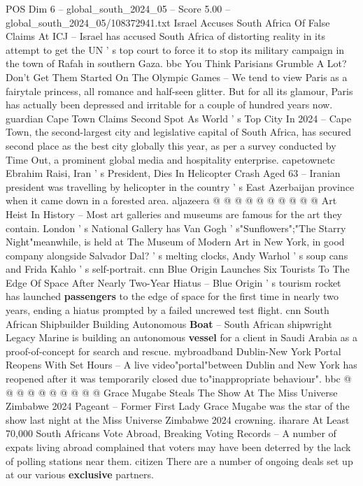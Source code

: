 \begin{textsample}{POS Dim 6 – global\_south\_2024\_05 – Score 5.00 – global\_south\_2024\_05/108372941.txt}  \label{ex:f6_pos_212}
Israel Accuses South Africa Of False Claims At ICJ -- Israel has accused South Africa of distorting reality in its attempt to get the UN ' s top court to force it to stop its military campaign in the town of Rafah in southern Gaza. bbc You Think Parisians Grumble A Lot?
Don't Get Them Started On The Olympic Games -- We tend to view Paris as a fairytale princess, all romance and half-seen glitter.
But for all its glamour, Paris has actually been depressed and irritable for a couple of hundred years now. guardian Cape Town Claims Second Spot As World ' s Top City In 2024 -- Cape Town, the second-largest city and legislative capital of South Africa, has secured second place as the best city globally this year, as per a survey conducted by Time Out, a prominent global media and hospitality enterprise. capetownetc Ebrahim Raisi, Iran ' s President, Dies In Helicopter Crash Aged 63 -- Iranian president was travelling by helicopter in the country ' s East Azerbaijan province when it came down in a forested area. aljazeera @ @ @ @ @ @ @ @ @ @ Art Heist In History -- Most art galleries and museums are famous for the art they contain.
London ' s National Gallery has Van Gogh ' s"Sunflowers";"The Starry Night"meanwhile, is held at The Museum of Modern Art in New York, in good company alongside Salvador Dal? ' s melting clocks, Andy Warhol ' s soup cans and Frida Kahlo ' s self-portrait. cnn Blue Origin Launches Six Tourists To The Edge Of Space After Nearly Two-Year Hiatus -- Blue Origin ' s tourism rocket has launched \textbf{passengers} to the edge of space for the first time in nearly two years, ending a hiatus prompted by a failed uncrewed test flight. cnn South African Shipbuilder Building Autonomous \textbf{Boat} -- South African shipwright Legacy Marine is building an autonomous \textbf{vessel} for a client in Saudi Arabia as a proof-of-concept for search and rescue. mybroadband Dublin-New York Portal Reopens With Set Hours -- A live video"portal"between Dublin and New York has reopened after it was temporarily closed due to"inappropriate behaviour". bbc @ @ @ @ @ @ @ @ @ @ Grace Mugabe Steals The Show At The Miss Universe Zimbabwe 2024 Pageant -- Former First Lady Grace Mugabe was the star of the show last night at the Miss Universe Zimbabwe 2024 crowning. iharare At Least 70,000 South Africans Vote Abroad, Breaking Voting Records -- A number of expats living abroad complained that voters may have been deterred by the lack of polling stations near them. citizen There are a number of ongoing deals set up at our various \textbf{exclusive} partners.

\end{textsample}
